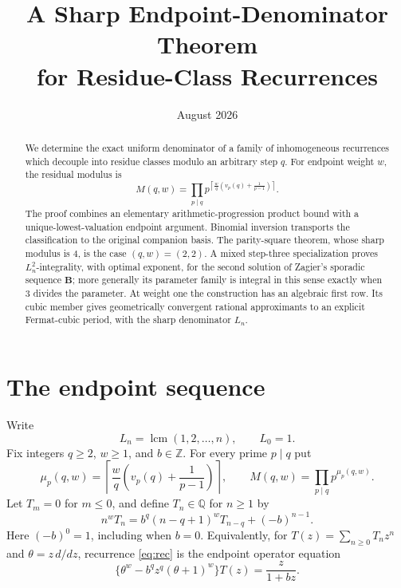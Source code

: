 \documentclass[11pt]{article}
\title{A Sharp Endpoint-Denominator Theorem\\
for Residue-Class Recurrences}
\author{}
\date{August 2026}
\theoremstyle{remark}
\newcommand{\Z}{\mathbb Z}
\newcommand{\Q}{\mathbb Q}
\begin{document}
\maketitle

\begin{abstract}
We determine the exact uniform denominator of a family of inhomogeneous
recurrences which decouple into residue classes modulo an arbitrary step
$q$.  For endpoint weight $w$, the residual modulus is
\[
 M(q,w)=\prod_{p\mid q}p^{\left\lceil
  \frac{w}{q}\left(v_p(q)+\frac1{p-1}\right)\right\rceil}.
\]
The proof combines an elementary arithmetic-progression product bound with a
unique-lowest-valuation endpoint argument.  Binomial inversion transports the
classification to the original companion basis.  The parity-square theorem,
whose sharp modulus is $4$, is the case $(q,w)=(2,2)$.  A mixed step-three
specialization proves $L_n^2$-integrality, with optimal exponent, for the
second solution of Zagier's sporadic sequence $\mathbf B$; more generally its
parameter family is integral in this sense exactly when $3$ divides the
parameter.  At weight one the construction has an algebraic first row.  Its
cubic member gives geometrically convergent rational approximants to an
explicit Fermat-cubic period, with the sharp denominator $L_n$.
\end{abstract}

\section{The endpoint sequence}

Write
\[
 L_n=\operatorname{lcm}(1,2,\ldots,n),\qquad L_0=1.
\]
Fix integers $q\ge2$, $w\ge1$, and $b\in\Z$.  For every prime $p\mid q$ put
\begin{equation}\label{eq:mu}
 \mu_p(q,w)=
 \left\lceil\frac{w}{q}
 \left(v_p(q)+\frac1{p-1}\right)\right\rceil,
 \qquad
 M(q,w)=\prod_{p\mid q}p^{\mu_p(q,w)}.
\end{equation}
Let $T_m=0$ for $m\le0$, and define $T_n\in\Q$ for $n\ge1$ by
\begin{equation}\label{eq:rec}
 n^wT_n=b^q(n-q+1)^wT_{n-q}+(-b)^{n-1}.
\end{equation}
Here $(-b)^0=1$, including when $b=0$.
Equivalently, for $T(z)=\sum_{n\ge0}T_nz^n$ and
$\theta=z\,d/dz$, recurrence \eqref{eq:rec} is the endpoint operator equation
\begin{equation}\label{eq:operator}
 \{\theta^w-b^qz^q(\theta+1)^w\}T(z)=\frac{z}{1+bz}.
\end{equation}
\end{document}
